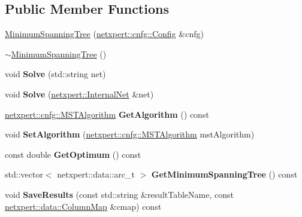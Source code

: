 \subsection*{Public Member Functions}
\begin{DoxyCompactItemize}
\item 
\hyperlink{classnetxpert_1_1MinimumSpanningTree_a7d1cd0fc061bd8b056f4317eabdcdc0a}{Minimum\+Spanning\+Tree} (\hyperlink{structnetxpert_1_1cnfg_1_1Config}{netxpert\+::cnfg\+::\+Config} \&cnfg)
\item 
\hyperlink{classnetxpert_1_1MinimumSpanningTree_ab3ad88e9f5a29b397de4e55f1ffb12f8}{$\sim$\+Minimum\+Spanning\+Tree} ()
\item 
void {\bfseries Solve} (std\+::string net)\hypertarget{classnetxpert_1_1MinimumSpanningTree_ae7ae3fa3b3be489c9d4de521a93b5afe}{}\label{classnetxpert_1_1MinimumSpanningTree_ae7ae3fa3b3be489c9d4de521a93b5afe}

\item 
void {\bfseries Solve} (\hyperlink{classnetxpert_1_1InternalNet}{netxpert\+::\+Internal\+Net} \&net)\hypertarget{classnetxpert_1_1MinimumSpanningTree_a9feb9c9f9d154da798f079b23f0f81f0}{}\label{classnetxpert_1_1MinimumSpanningTree_a9feb9c9f9d154da798f079b23f0f81f0}

\item 
\hyperlink{namespacenetxpert_1_1cnfg_ab77ff30f2da32945dbb19bdf6199f799}{netxpert\+::cnfg\+::\+M\+S\+T\+Algorithm} {\bfseries Get\+Algorithm} () const \hypertarget{classnetxpert_1_1MinimumSpanningTree_ac3f3aae29b21d63a744337e1a1f3e731}{}\label{classnetxpert_1_1MinimumSpanningTree_ac3f3aae29b21d63a744337e1a1f3e731}

\item 
void {\bfseries Set\+Algorithm} (\hyperlink{namespacenetxpert_1_1cnfg_ab77ff30f2da32945dbb19bdf6199f799}{netxpert\+::cnfg\+::\+M\+S\+T\+Algorithm} mst\+Algorithm)\hypertarget{classnetxpert_1_1MinimumSpanningTree_ab78ec431e6e093d7add8c4cbf2e42ef2}{}\label{classnetxpert_1_1MinimumSpanningTree_ab78ec431e6e093d7add8c4cbf2e42ef2}

\item 
const double {\bfseries Get\+Optimum} () const \hypertarget{classnetxpert_1_1MinimumSpanningTree_a5a8777928028df716efcabd643cf3506}{}\label{classnetxpert_1_1MinimumSpanningTree_a5a8777928028df716efcabd643cf3506}

\item 
std\+::vector$<$ netxpert\+::data\+::arc\+\_\+t $>$ {\bfseries Get\+Minimum\+Spanning\+Tree} () const \hypertarget{classnetxpert_1_1MinimumSpanningTree_a79bb14f2ccab2abcacf9bb466d1e3a1c}{}\label{classnetxpert_1_1MinimumSpanningTree_a79bb14f2ccab2abcacf9bb466d1e3a1c}

\item 
void {\bfseries Save\+Results} (const std\+::string \&result\+Table\+Name, const \hyperlink{structnetxpert_1_1data_1_1ColumnMap}{netxpert\+::data\+::\+Column\+Map} \&cmap) const \hypertarget{classnetxpert_1_1MinimumSpanningTree_a958dacf0024f62a9bd46a4bef28827f7}{}\label{classnetxpert_1_1MinimumSpanningTree_a958dacf0024f62a9bd46a4bef28827f7}

\end{DoxyCompactItemize}


